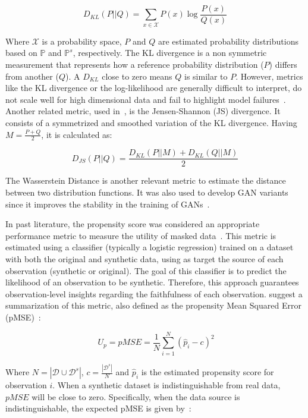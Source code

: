 \begin{equation}
    D_{KL}(P||Q) = \sum_{x\in\mathcal{X}}P(x)\log{\frac{P(x)}{Q(x)}}
\end{equation}

Where $\mathcal{X}$ is a probability space, $P$ and $Q$ are estimated
probability distributions based on $\mathbb{P}$ and $\mathbb{P}^s$,
respectively. The KL divergence is a non symmetric measurement that represents
how a reference probability distribution ($P$) differs from another
($Q$). A $D_{KL}$ close to zero means $Q$ is similar to $P$. However, metrics
like the KL divergence or the log-likelihood are generally difficult to
interpret, do not scale well for high dimensional data and fail to
highlight model failures~\cite{alaa2022faithful}. Another related metric, used
in~\cite{zhao2021ctab}, is the Jensen-Shannon (JS) divergence. It consists of
a symmetrized and smoothed variation of the KL divergence. Having
$M=\frac{P+Q}{2}$, it is calculated as:

\begin{equation}
    D_{JS}(P||Q) = \frac{D_{KL}(P||M) + D_{KL}(Q||M)}{2}
\end{equation}

The Wasserstein Distance is another relevant metric to estimate the
distance between two distribution functions. It was also used to develop GAN
variants since it improves the stability in the training of
GANs~\cite{gulrajani2017improved, goncalves2020generation}.

In past literature, the propensity score was considered an appropriate
performance metric to measure the utility of masked data~\cite{woo2009global}.
This metric is estimated using a classifier (typically a logistic regression)
trained on a dataset with both the original and synthetic data, using as
target the source of each observation (synthetic or original). The goal of
this classifier is to predict the likelihood of an observation to be
synthetic. Therefore, this approach guarantees observation-level insights
regarding the faithfulness of each observation. \citet{woo2009global} suggest
a summarization of this metric, also defined as the propensity Mean Squared Error
(pMSE)~\cite{chundawat2022tabsyndex}:

\begin{equation}~\label{ep:propensity}
    U_p = pMSE = \frac{1}{N} \sum^N_{i=1}{(\hat{p}_i - c)}^2
\end{equation}

Where $N = |\mathcal{D} \cup \mathcal{D}^s|$, $c = \frac{|\mathcal{D}^s|}{N}$
and $\hat{p}_i$ is the estimated propensity score for observation $i$. When a
synthetic dataset is indistinguishable from real data, $pMSE$ will be close to
zero. Specifically, when the data source is indistinguishable, the expected
pMSE is given by~\cite{snoke2018general}:


